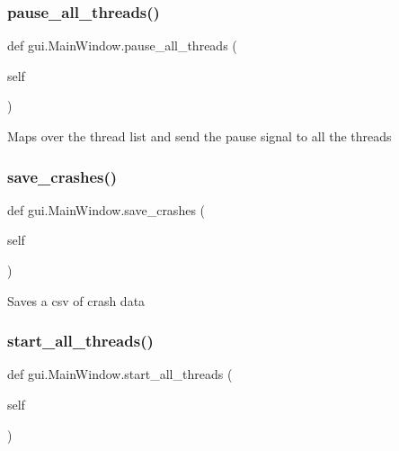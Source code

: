\subsubsection{\texorpdfstring{pause\+\_\+all\+\_\+threads()}{pause\_all\_threads()}}
{\footnotesize\ttfamily def gui.\+Main\+Window.\+pause\+\_\+all\+\_\+threads (\begin{DoxyParamCaption}\item[{}]{self }\end{DoxyParamCaption})}

\begin{DoxyVerb}Maps over the thread list and send the pause signal to all the threads\end{DoxyVerb}
 \mbox{\label{classgui_1_1_main_window_a853bf5d74c10b4dce43bf7ce00cb1ffd}} 
\subsubsection{\texorpdfstring{save\+\_\+crashes()}{save\_crashes()}}
{\footnotesize\ttfamily def gui.\+Main\+Window.\+save\+\_\+crashes (\begin{DoxyParamCaption}\item[{}]{self }\end{DoxyParamCaption})}

\begin{DoxyVerb}Saves a csv of crash data \end{DoxyVerb}
 \mbox{\label{classgui_1_1_main_window_a96d022201d286c60c202468c29379170}} 
\subsubsection{\texorpdfstring{start\+\_\+all\+\_\+threads()}{start\_all\_threads()}}
{\footnotesize\ttfamily def gui.\+Main\+Window.\+start\+\_\+all\+\_\+threads (\begin{DoxyParamCaption}\item[{}]{self }\end{DoxyParamCaption})}

